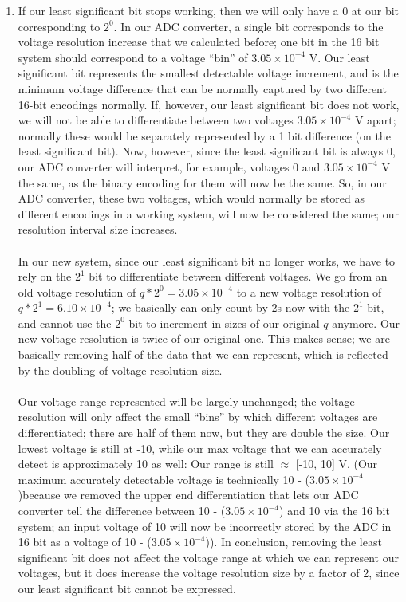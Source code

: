 \documentclass[12pt, a4paper]{article}
\begin{document}
\begin{enumerate}
\begin{enumerate}
\item 
If our least significant bit stops working, then we will only have a 0 at our bit corresponding to $2^{0}$. In our ADC converter, a single bit corresponds to the voltage resolution increase that we calculated before; one bit in the 16 bit system should correspond to a voltage ``bin'' of $3.05 \times 10^{-4}$ V. Our least significant bit represents the smallest detectable voltage increment, and is the minimum voltage difference that can be normally captured by two different 16-bit encodings normally. If, however, our least significant bit does not work, we will not be able to differentiate between two voltages $3.05 \times 10^{-4}$ V apart; normally these would be separately represented by a 1 bit difference (on the least significant bit). Now, however, since the least significant bit is always 0, our ADC converter will interpret, for example, voltages 0 and $3.05 \times 10^{-4}$ V the same, as the binary encoding for them will now be the same. So, in our ADC converter, these two voltages, which would normally be stored as different encodings in a working system, will now be considered the same; our resolution interval size increases. \\ \\
In our new system, since our least significant bit no longer works, we have to rely on the $2^{1}$ bit to differentiate between different voltages. We go from an old voltage resolution of $q * 2^0 = 3.05 \times 10^{-4}$ to a new voltage resolution of $q * 2^{1} = 6.10 \times 10^{-4}$; we basically can only count by 2s now with the $2^1$ bit, and cannot use the $2^0$ bit to increment in sizes of our original $q$ anymore. Our new voltage resolution is twice of our original one. This makes sense; we are basically removing half of the data that we can represent, which is reflected by the doubling of voltage resolution size. \\ \\
Our voltage range represented will be largely unchanged; the voltage resolution will only affect the small ``bins'' by which different voltages are differentiated; there are half of them now, but they are double the size. Our lowest voltage is still at -10, while our max voltage that we can accurately detect is approximately 10 as well: Our range is still $\approx$ [-10, 10] V. (Our maximum accurately detectable voltage is technically 10 - ($3.05 \times 10^{-4}$ )because we removed the upper end differentiation that lets our ADC converter tell the difference between 10 - ($3.05 \times 10^{-4}$) and 10 via the 16 bit system; an input voltage of 10 will now be incorrectly stored by the ADC in 16 bit as a voltage of 10 - ($3.05 \times 10^{-4}$)). 
In conclusion, removing the least significant bit does not affect the voltage range at which we can represent our voltages, but it does increase the voltage resolution size by a factor of 2, since our least significant bit cannot be expressed.


\end{enumerate}
\end{enumerate}
\end{document}
